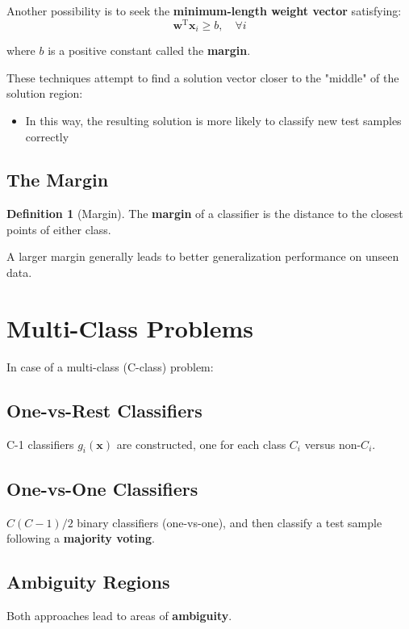 \documentclass[11pt,a4paper]{article}
\theoremstyle{definition}
\newtheorem{definition}{Definition}[section]
\theoremstyle{plain}
\theoremstyle{remark}
\begin{document}
Another possibility is to seek the \textbf{minimum-length weight vector} satisfying:
\[
\mathbf{w}^{\mathrm{T}} \mathbf{x}_i \geq b, \quad \forall i
\]

where $b$ is a positive constant called the \textbf{margin}.

These techniques attempt to find a solution vector closer to the "middle" of the solution region:
\begin{itemize}
    \item In this way, the resulting solution is more likely to classify new test samples correctly
\end{itemize}

\subsection{The Margin}

\begin{definition}[Margin]
The \textbf{margin} of a classifier is the distance to the closest points of either class.
\end{definition}

A larger margin generally leads to better generalization performance on unseen data.

\section{Multi-Class Problems}

In case of a multi-class (C-class) problem:

\begin{tcolorbox}[colback=purple!5!white,colframe=purple!75!black,title=\textbf{Multi-Class Classification Strategies}]
\subsection*{One-vs-Rest Classifiers}
C-1 classifiers $g_i(\mathbf{x})$ are constructed, one for each class $C_i$ versus non-$C_i$.

\subsection*{One-vs-One Classifiers}
$C(C-1)/2$ binary classifiers (one-vs-one), and then classify a test sample following a \textbf{majority voting}.

\subsection*{Ambiguity Regions}
Both approaches lead to areas of \textbf{ambiguity}.
\end{tcolorbox}
\end{document}
